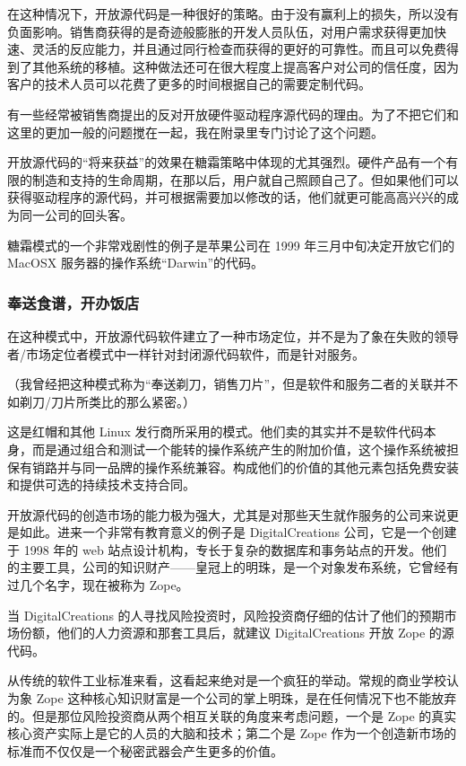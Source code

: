 在这种情况下，开放源代码是一种很好的策略。由于没有赢利上的损失，所以没有负面影响。销售商获得的是奇迹般膨胀的开发人员队伍，对用户需求获得更加快速、灵活的反应能力，并且通过同行检查而获得的更好的可靠性。而且可以免费得到了其他系统的移植。这种做法还可在很大程度上提高客户对公司的信任度，因为客户的技术人员可以花费了更多的时间根据自己的需要定制代码。


有一些经常被销售商提出的反对开放硬件驱动程序源代码的理由。为了不把它们和这里的更加一般的问题搅在一起，我在附录里专门讨论了这个问题。


开放源代码的“将来获益”的效果在糖霜策略中体现的尤其强烈。硬件产品有一个有限的制造和支持的生命周期，在那以后，用户就自己照顾自己了。但如果他们可以获得驱动程序的源代码，并可根据需要加以修改的话，他们就更可能高高兴兴的成为同一公司的回头客。


糖霜模式的一个非常戏剧性的例子是苹果公司在 1999 年三月中旬决定开放它们的 MacOSX 服务器的操作系统“Darwin”的代码。

\subsubsection{奉送食谱，开办饭店}
在这种模式中，开放源代码软件建立了一种市场定位，并不是为了象在失败的领导者/市场定位者模式中一样针对封闭源代码软件，而是针对服务。


（我曾经把这种模式称为“奉送剃刀，销售刀片”，但是软件和服务二者的关联并不如剃刀/刀片所类比的那么紧密。）


这是红帽和其他 Linux 发行商所采用的模式。他们卖的其实并不是软件代码本身，而是通过组合和测试一个能转的操作系统产生的附加价值，这个操作系统被担保有销路并与同一品牌的操作系统兼容。构成他们的价值的其他元素包括免费安装和提供可选的持续技术支持合同。


开放源代码的创造市场的能力极为强大，尤其是对那些天生就作服务的公司来说更是如此。进来一个非常有教育意义的例子是 DigitalCreations 公司，它是一个创建于 1998 年的 web 站点设计机构，专长于复杂的数据库和事务站点的开发。他们的主要工具，公司的知识财产——皇冠上的明珠，是一个对象发布系统，它曾经有过几个名字，现在被称为 Zope。


当 DigitalCreations 的人寻找风险投资时，风险投资商仔细的估计了他们的预期市场份额，他们的人力资源和那套工具后，就建议 DigitalCreations 开放 Zope 的源代码。


从传统的软件工业标准来看，这看起来绝对是一个疯狂的举动。常规的商业学校认为象 Zope 这种核心知识财富是一个公司的掌上明珠，是在任何情况下也不能放弃的。但是那位风险投资商从两个相互关联的角度来考虑问题，一个是 Zope 的真实核心资产实际上是它的人员的大脑和技术；第二个是 Zope 作为一个创造新市场的标准而不仅仅是一个秘密武器会产生更多的价值。


